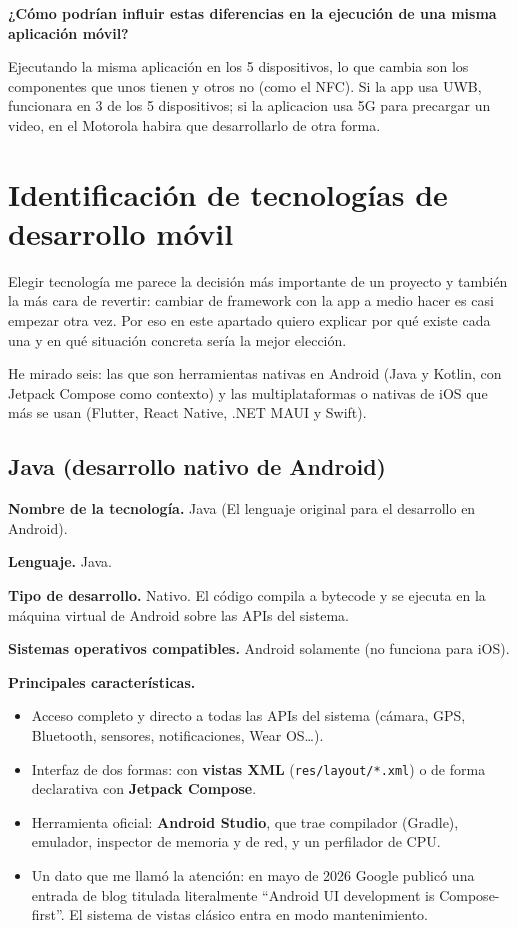 \documentclass[11pt,a4paper]{article}
\newcommand{\code}[1]{\texttt{\color{ink}#1}}
\newcommand{\campo}[1]{\textbf{\color{ink}#1}}
\begin{document}
	\campo{¿Cómo podrían influir estas diferencias en la ejecución de una misma aplicación móvil?}
	
	Ejecutando la misma aplicación en los 5 dispositivos, lo que cambia son los componentes que unos tienen y otros no (como el NFC). Si la app usa UWB, funcionara en 3 de los 5 dispositivos; si la aplicacion usa 5G para precargar un video, en el Motorola habira que desarrollarlo de otra forma.
	
	\section{Identificación de tecnologías de desarrollo móvil}
	
	Elegir tecnología me parece la decisión más importante de un proyecto y también la más cara de revertir: cambiar de framework con la app a medio hacer es casi empezar otra vez. Por eso en este apartado quiero explicar por qué existe cada una y en qué situación concreta sería la mejor elección.
	
	He mirado seis: las que son herramientas nativas en Android (Java y Kotlin, con Jetpack Compose como contexto) y las multiplataformas o nativas de iOS que más se usan (Flutter, React Native, .NET MAUI y Swift).
	
	\subsection{Java (desarrollo nativo de Android)}
	
  \campo{Nombre de la tecnología.} Java (El lenguaje original para el desarrollo en Android).
	
	\campo{Lenguaje.} Java.
	
	\campo{Tipo de desarrollo.} Nativo. El código compila a bytecode y se ejecuta en la máquina virtual de Android sobre las APIs del sistema.
	
	\campo{Sistemas operativos compatibles.} Android solamente (no funciona para iOS).
	
	\campo{Principales características.}
	\begin{itemize}[leftmargin=*,itemsep=0.2em,topsep=0.2em]
		\item Acceso completo y directo a todas las APIs del sistema (cámara, GPS, Bluetooth, sensores, notificaciones, Wear OS\ldots).
		\item Interfaz de dos formas: con \textbf{vistas XML} (\code{res/layout/*.xml}) o de forma declarativa con \textbf{Jetpack Compose}.
		\item Herramienta oficial: \textbf{Android Studio}, que trae compilador (Gradle), emulador, inspector de memoria y de red, y un perfilador de CPU.
		\item Un dato que me llamó la atención: en mayo de 2026 Google publicó una entrada de blog titulada literalmente \enquote{Android UI development is Compose-first}. El sistema de vistas clásico entra en modo mantenimiento.
	\end{itemize}
	
\end{document}
